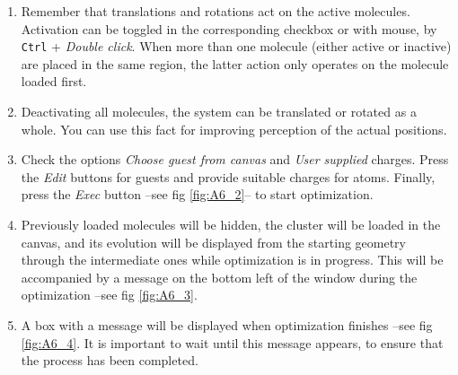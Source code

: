 \documentclass[10pt]{article}
\begin{document}
\begin{enumerate}
\item Remember that translations and rotations act on the active molecules.
Activation can be toggled in the corresponding checkbox or with mouse, by
\texttt{Ctrl} + {\it Double click}.  When more than one molecule 
(either active or inactive) are placed in the same region, the latter action
only operates on the molecule loaded first.

\item Deactivating all molecules, the system can be translated or rotated as
a whole. You can use this fact for improving perception of the actual 
positions.

\item Check the options {\it Choose guest from canvas} and {\it User supplied} 
charges. Press the {\it Edit} buttons for guests and provide suitable charges 
for atoms. Finally, press
the {\it Exec} button  --see fig \ref{fig:A6_2}-- to start optimization.

\item Previously loaded molecules will be hidden, the cluster 
will be loaded in the canvas, and its evolution will be
displayed from the starting geometry through the intermediate ones
while optimization is in progress. This will be accompanied by
a message on the bottom left of the window during the optimization
--see fig \ref{fig:A6_3}.

\item A box with a message will be displayed when optimization finishes
--see fig \ref{fig:A6_4}.
It is important to wait until this message appears, to ensure that
the process has been completed.


\end{enumerate}
\end{document}
